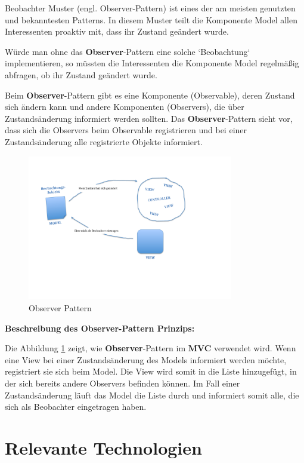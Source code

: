 Beobachter Muster (engl. Observer-Pattern) ist eines der am meisten genutzten und bekanntesten Patterns. In diesem Muster teilt die Komponente Model allen Interessenten proaktiv mit, dass ihr Zustand geändert wurde.

Würde man ohne das \textbf{Observer}-Pattern eine solche `Beobachtung` implementieren, so müssten die Interessenten die Komponente Model regelmäßig abfragen, ob ihr Zustand geändert wurde.

Beim \textbf{Observer}-Pattern gibt es eine Komponente (Observable), deren Zustand sich ändern kann und andere Komponenten (Observers), die über Zustandsänderung informiert werden sollten. Das \textbf{Observer}-Pattern sieht vor, dass sich die Observers beim Observable registrieren und bei einer Zustandsänderung alle registrierte Objekte informiert.

\begin{figure}[H]
\centering
\includegraphics[trim = 0mm 0mm 0mm 0mm, clip, width=0.8\textwidth]{resources/observer}
\caption[Observer Pattern]{Observer Pattern}
\label{img:observer}
\end{figure}

\textbf{Beschreibung des \textbf{Observer}-Pattern Prinzips:}

Die Abbildung \ref{img:observer} zeigt, wie \textbf{Observer}-Pattern im \textbf{MVC} verwendet wird. Wenn eine View bei einer Zustandsänderung des Models informiert werden möchte, registriert sie sich beim Model. Die View wird somit in die Liste hinzugefügt, in der sich bereits andere Observers befinden können. Im Fall einer Zustandsänderung läuft das Model die Liste durch und informiert somit alle, die sich als Beobachter eingetragen haben.

\section{Relevante Technologien}


